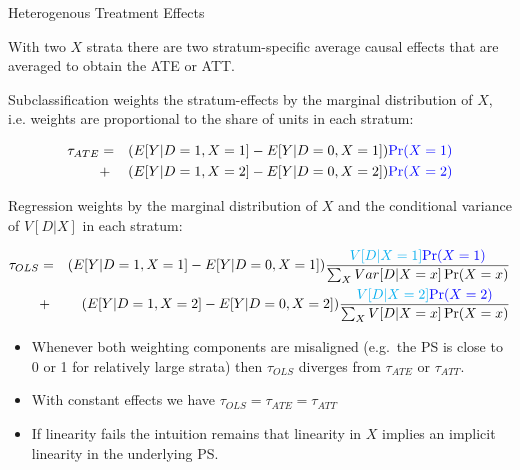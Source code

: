 \documentclass{beamer}
\numberwithin{equation}{section}
\begin{document}
\begin{frame}{Heterogenous Treatment Effects}

\scriptsize

With two $X$ strata there are two stratum-specific average causal
effects that are averaged to obtain the ATE or ATT.

Subclassification weights the stratum-effects by the marginal
distribution of $X$, i.e. weights are proportional to the share of units in each stratum:


\begin{eqnarray*}
\tau_{ATE} &=& (E[Y|D=1,X=1]-E[Y|D=0,X=1])\textcolor{blue}{\Pr(X=1)} \\
   &+&   (E[Y|D=1,X=2]-E[Y|D=0,X=2])\textcolor{blue}{\Pr(X=2)}
\end{eqnarray*}

Regression weights by the marginal distribution of $X$ \alert{and} the
conditional variance of $V[D|X]$ in each stratum:

\begin{eqnarray*}
  \tau_{OLS} &=& (E[Y|D=1,X=1]- E[Y|D=0,X=1])\frac{\textcolor{cyan}{V[D|X=1]}\textcolor{blue}{\Pr(X=1)}}{\sum_{X}Var[D|X=x]\Pr(X=x)} \\
   &+& (E[Y|D=1,X=2]- E[Y|D=0,X=2])\frac{\textcolor{cyan}{V[D|X=2]}\textcolor{blue}{\Pr(X=2)}}{\sum_{X}V[D|X=x]\Pr(X=x)}
\end{eqnarray*}

\begin{itemize}
\itemsep1pt\parskip0pt
\item
  Whenever both weighting components are misaligned (e.g.~the PS is
  close to 0 or 1 for relatively large strata) then $\tau_{OLS}$
  diverges from $\tau_{ATE}$ or $\tau_{ATT}$.
\item
  With constant effects we have $\tau_{OLS}=\tau_{ATE}=\tau_{ATT}$
\item
  If linearity fails the intuition remains that linearity in $X$ implies
  an implicit linearity in the underlying PS.
\end{itemize}

\end{frame}
\end{document}
